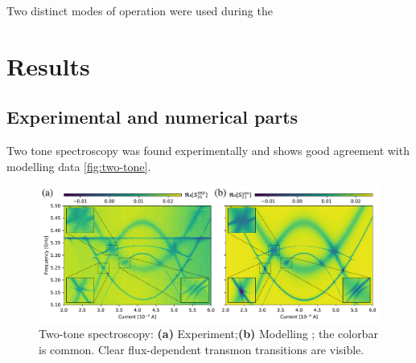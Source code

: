 \documentclass[%
 aip,
 amsmath,amssymb,
 reprint,%
]{revtex4-1}
\begin{document}
Two distinct modes of operation were used during the 


\section{Results}

\subsection{\label{sec:level1} Experimental and numerical parts}
Two tone spectroscopy was found experimentally and shows good agreement with modelling data \autoref{fig:two-tone}. 

\begin{figure}
	\centering
	\includegraphics[width=\linewidth]{main_picture}
	\caption{Two-tone spectroscopy: \textbf{(a)} Experiment;\textbf{(b)} Modelling ; the colorbar is common.  Clear flux-dependent transmon transitions are visible.}
	\label{fig:two-tone}
\end{figure}
\end{document}
